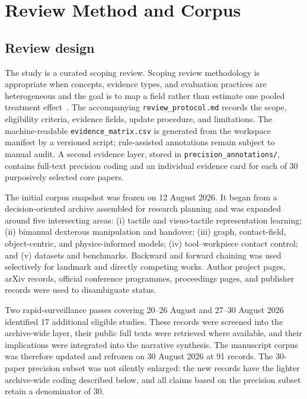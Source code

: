 \section{Review Method and Corpus}
\label{sec:method}

\subsection{Review design}

The study is a curated scoping review. Scoping review methodology is appropriate
when concepts, evidence types, and evaluation practices are heterogeneous and the
goal is to map a field rather than estimate one pooled treatment
effect~\cite{tricco2018prismascr}. The accompanying \texttt{review\_protocol.md}
records the scope, eligibility criteria, evidence fields, update procedure, and
limitations. The machine-readable \texttt{evidence\_matrix.csv} is generated from
the workspace manifest by a versioned script; rule-assisted annotations remain
subject to manual audit. A second evidence layer, stored in
\texttt{precision\_annotations/}, contains full-text precision coding and an
individual evidence card for each of 30 purposively selected core papers.

The initial corpus snapshot was frozen on 12 August 2026. It began from a decision-oriented archive
assembled for research planning and was expanded around five intersecting areas:
(i) tactile and visuo-tactile representation learning; (ii) bimanual dexterous
manipulation and handover; (iii) graph, contact-field, object-centric, and
physics-informed models; (iv) tool--workpiece contact control; and (v) datasets
and benchmarks. Backward and forward chaining was used selectively for landmark
and directly competing works. Author project pages, arXiv records, official
conference programmes, proceedings pages, and publisher records were used to
disambiguate status.

Two rapid-surveillance passes covering 20--26 August and 27--30 August 2026
identified 17 additional eligible studies. These records were screened into the
archive-wide layer, their public full texts were retrieved where available, and
their implications were integrated into the narrative synthesis. The manuscript
corpus was therefore updated and refrozen on 30 August 2026 at 91 records. The
30-paper precision subset was not silently enlarged: the new records have the
lighter archive-wide coding described below, and all claims based on the precision
subset retain a denominator of 30.

